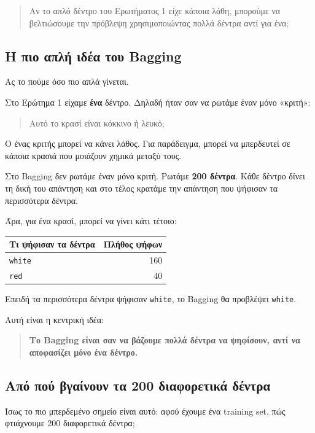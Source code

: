 \documentclass[12pt,a4paper]{article}
\newcommand{\code}[1]{\texttt{\textenglish{#1}}}
\begin{document}
\begin{quote}
Αν το απλό δέντρο του Ερωτήματος 1 είχε κάποια λάθη, μπορούμε να βελτιώσουμε
την πρόβλεψη χρησιμοποιώντας πολλά δέντρα αντί για ένα;
\end{quote}

\subsection{Η πιο απλή ιδέα του Bagging}

Ας το πούμε όσο πιο απλά γίνεται.

Στο Ερώτημα 1 είχαμε \textbf{ένα} δέντρο. Δηλαδή ήταν σαν να ρωτάμε έναν μόνο
«κριτή»:

\begin{quote}
Αυτό το κρασί είναι κόκκινο ή λευκό;
\end{quote}

Ο ένας κριτής μπορεί να κάνει λάθος. Για παράδειγμα, μπορεί να μπερδευτεί σε
κάποια κρασιά που μοιάζουν χημικά μεταξύ τους.

Στο Bagging δεν ρωτάμε έναν μόνο κριτή. Ρωτάμε \textbf{200 δέντρα}. Κάθε
δέντρο δίνει τη δική του απάντηση και στο τέλος κρατάμε την απάντηση που
ψήφισαν τα περισσότερα δέντρα.

Άρα, για ένα κρασί, μπορεί να γίνει κάτι τέτοιο:

\begin{center}
\begin{tabular}{lr}
\toprule
\textbf{Τι ψήφισαν τα δέντρα} & \textbf{Πλήθος ψήφων} \\
\midrule
\code{white} & 160 \\
\code{red} & 40 \\
\bottomrule
\end{tabular}
\end{center}

Επειδή τα περισσότερα δέντρα ψήφισαν \code{white}, το Bagging θα προβλέψει
\code{white}.

Αυτή είναι η κεντρική ιδέα:

\begin{quote}
\textbf{Το Bagging είναι σαν να βάζουμε πολλά δέντρα να ψηφίσουν, αντί να
αποφασίζει μόνο ένα δέντρο.}
\end{quote}

\subsection{Από πού βγαίνουν τα 200 διαφορετικά δέντρα}

Ίσως το πιο μπερδεμένο σημείο είναι αυτό: αφού έχουμε ένα training set, πώς
φτιάχνουμε 200 διαφορετικά δέντρα;
\end{document}

